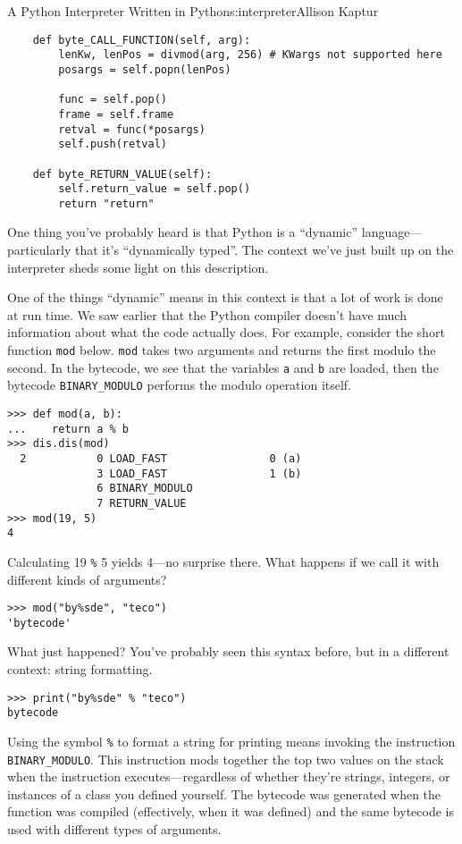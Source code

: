 \begin{aosachapter}{A Python Interpreter Written in Python}{s:interpreter}{Allison Kaptur}
\begin{verbatim}
    def byte_CALL_FUNCTION(self, arg):
        lenKw, lenPos = divmod(arg, 256) # KWargs not supported here
        posargs = self.popn(lenPos)

        func = self.pop()
        frame = self.frame
        retval = func(*posargs)
        self.push(retval)

    def byte_RETURN_VALUE(self):
        self.return_value = self.pop()
        return "return"
\end{verbatim}

\label{dynamic-typing-what-the-compiler-doesnt-know}

One thing you've probably heard is that Python is a ``dynamic''
language---particularly that it's ``dynamically typed''. The context
we've just built up on the interpreter sheds some light on this
description.

One of the things ``dynamic'' means in this context is that a lot of
work is done at run time. We saw earlier that the Python compiler
doesn't have much information about what the code actually does. For
example, consider the short function \texttt{mod} below. \texttt{mod}
takes two arguments and returns the first modulo the second. In the
bytecode, we see that the variables \texttt{a} and \texttt{b} are
loaded, then the bytecode \texttt{BINARY\_MODULO} performs the modulo
operation itself.

\begin{verbatim}
>>> def mod(a, b):
...    return a % b
>>> dis.dis(mod)
  2           0 LOAD_FAST                0 (a)
              3 LOAD_FAST                1 (b)
              6 BINARY_MODULO
              7 RETURN_VALUE
>>> mod(19, 5)
4
\end{verbatim}

Calculating 19 \texttt{\%} 5 yields 4---no surprise there. What happens
if we call it with different kinds of arguments?

\begin{verbatim}
>>> mod("by%sde", "teco")
'bytecode'
\end{verbatim}

What just happened? You've probably seen this syntax before, but in a
different context: string formatting.

\begin{verbatim}
>>> print("by%sde" % "teco")
bytecode
\end{verbatim}

Using the symbol \texttt{\%} to format a string for printing means
invoking the instruction \texttt{BINARY\_MODULO}. This instruction mods
together the top two values on the stack when the instruction
executes---regardless of whether they're strings, integers, or instances
of a class you defined yourself. The bytecode was generated when the
function was compiled (effectively, when it was defined) and the same
bytecode is used with different types of arguments.


\end{aosachapter}
